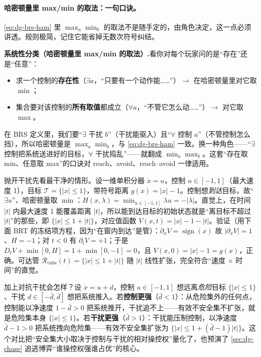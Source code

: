 \paragraph{哈密顿量里 max/min 的取法：一句口诀。}
\cref{eq:dg-brs-ham} 里 $\max_a\min_b$ 的取法不是随手定的，由角色决定，这一点必须讲透。规则极简，记住它能省掉无数次符号纠结。

\begin{note}
\textbf{系统性分类（哈密顿量里 max/min 的取法）.}\;看你对每个玩家问的是“存在”还是“任意”：
\begin{itemize}
  \item 求一个控制的\textbf{存在性}（$\exists a$，“只要有一个动作能……”）$\to$ 在哈密顿量里对它取 $\min$；
  \item 集合要对该控制的\textbf{所有取值}都成立（$\forall a$，“不管它怎么动……”）$\to$ 对它取 $\max$。
\end{itemize}
在 BRS 定义里，我们要“$\exists$ 干扰 $b$”（干扰能驱入）且“$\forall$ 控制 $a$”（不管控制怎么挡），所以哈密顿量是 $\max_a\min_b$，与 \cref{eq:dg-brs-ham} 一致。换一种角色——“$\exists$ 控制把系统送进好的目标，$\forall$ 干扰捣乱”——就翻成 $\min_a\max_b$。这套“存在取 min、任意取 max”的口诀对 reach、avoid、reach--avoid 一律适用。
\end{note}

\begin{example}
\label{ex:dg-integrator}
抛开干扰先看最干净的情形。设一维单积分器 $\dot x=u$，控制 $u\in[-1,1]$（最大速度 1），目标 $\mathcal{T}=\{|x|\le1\}$，带符号距离 $g(x)=|x|-1$。控制想\emph{到达}目标，故“$\exists u$”、哈密顿量取 $\min$：$H(x,\lambda)=\min_{u\in[-1,1]}\lambda u=-|\lambda|$。直觉上，在时间 $|t|$ 内最大速度 1 能覆盖距离 $|t|$，所以能到达目标的初始状态就是“离目标不超过 $|t|$”的那些，即 $\{|x|\le1+|t|\}$，对应值函数 $V(x,t)=|x|-1-|t|$。验证（用下面 BRT 的冻结项方程，因为“在窗内到达”是管）：$\partial_x V=\operatorname{sign}(x)$ 故 $|\partial_x V|=1$、$H=-1$；对 $t<0$ 有 $\partial_t V=+1$；于是 $D_t V+\min[0,H]=1+\min[0,-1]=0$，且 $V(x,0)=|x|-1=g(x)$，正确。可达管 $\mathcal{R}_{\text{tube}}(t)=\{|x|\le1+|t|\}$ 随 $|t|$ 线性扩张，完全符合“速度 × 时间”的直觉。

加上对抗干扰会怎样？设 $\dot x=u+d$，控制 $u\in[-1,1]$ 想远离\emph{危险}目标 $\{|x|\le1\}$、干扰 $d\in[-\bar d,\bar d]$ 想把系统推入。若\textbf{控制更强}（$\bar d<1$）：从危险集外的任何点，控制能以净速度 $1-\bar d>0$ 把系统推开，干扰追不上——有效不安全集不扩张，就是危险集本身 $\{|x|\le1\}$。若\textbf{干扰更强}（$\bar d>1$）：干扰能压制控制，以净速度 $\bar d-1>0$ 把系统拽向危险集——有效不安全集扩张为 $\{|x|\le1+(\bar d-1)|t|\}$。这个对比把“安全集大小取决于控制与干扰的相对操控权”量化了，也预演了 \cref{sec:dg-chase} 追逃博弈“谁操控权强谁占优”的核心。
\end{example}

